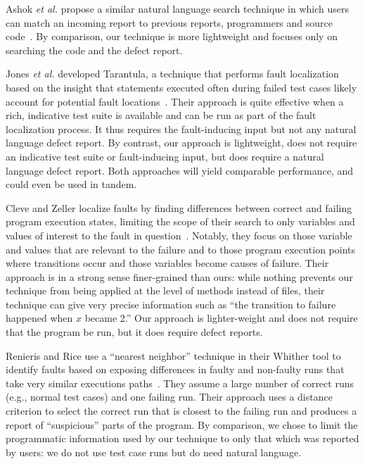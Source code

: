 \documentclass[conference]{IEEEtran}
\begin{document}
Ashok \textit{et al.} propose a similar natural language search technique
in which users can match an incoming report to previous reports,
programmers and source code~\cite{Ashok09}.  By comparison, our technique
is more lightweight and focuses only on searching the code and the
defect report.

Jones \textit{et al.} developed Tarantula, a technique that performs
fault localization based on the insight that statements executed often
during failed test cases likely account for potential fault
locations~\cite{harrold05}. Their approach is quite effective when
a rich, indicative test suite is available and can be run as part of
the fault localization process. It thus requires the fault-inducing
input but not any natural language defect report. By contrast,
our approach is lightweight, does not require an indicative test
suite or fault-inducing input, but does require a natural language
defect report. Both approaches will yield comparable performance, and
could even be used in tandem.

Cleve and Zeller localize faults by finding differences between
correct and failing program execution states, limiting the scope of
their search to only variables and values of interest to the fault in
question~\cite{cleve05}. Notably, they focus on those variable and
values that are relevant to the failure and to those program execution
points where transitions occur and those variables become causes of
failure. Their approach is in a strong sense finer-grained than ours:
while nothing prevents our technique from being applied at the level
of methods instead of files, their technique can give very precise
information such as ``the transition to failure happened when $x$
became 2.'' Our approach is lighter-weight and does not require
that the program be run, but it does require defect reports.

Renieris and Rice use a ``nearest neighbor'' technique in their
Whither tool to identify faults based on exposing differences in
faulty and non-faulty runs that take very similar executions
paths~\cite{Renieris03}. They assume a large number of correct runs
(e.g., normal test cases) and one failing run. Their approach uses a
distance criterion to select the correct run that is closest to the
failing run and produces a report of ``suspicious'' parts of the
program. By comparison, we chose to limit the programmatic information
used by our technique to only that which was reported by users: we
do not use test case runs but do need natural language.
\end{document}
